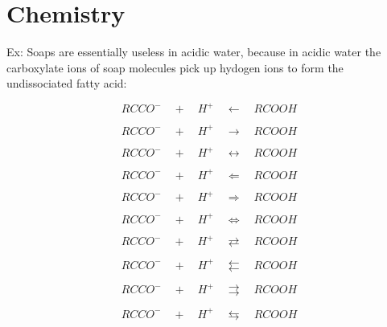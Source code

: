 \documentclass{article}
\begin{document}
\section{Chemistry}

Ex:
Soaps are essentially useless in acidic water, because in acidic water the carboxylate
ions of soap molecules pick up hydogen ions to form the undissociated fatty acid:

$$RCCO^- \quad + \quad H^+ \quad\longleftarrow\quad RCOOH$$

$$RCCO^- \quad + \quad H^+ \quad\longrightarrow\quad RCOOH$$

$$RCCO^- \quad + \quad H^+ \quad\longleftrightarrow\quad RCOOH$$

$$RCCO^- \quad + \quad H^+ \quad\Longleftarrow\quad RCOOH$$

$$RCCO^- \quad + \quad H^+ \quad\Longrightarrow\quad RCOOH$$

$$RCCO^- \quad + \quad H^+ \quad\Longleftrightarrow\quad RCOOH$$

$$RCCO^- \quad + \quad H^+ \quad\rightleftarrows\quad RCOOH$$

$$RCCO^- \quad + \quad H^+ \quad\leftleftarrows\quad RCOOH$$

$$RCCO^- \quad + \quad H^+ \quad\rightrightarrows\quad RCOOH$$

$$RCCO^- \quad + \quad H^+ \quad\leftrightarrows\quad RCOOH$$
\end{document}
